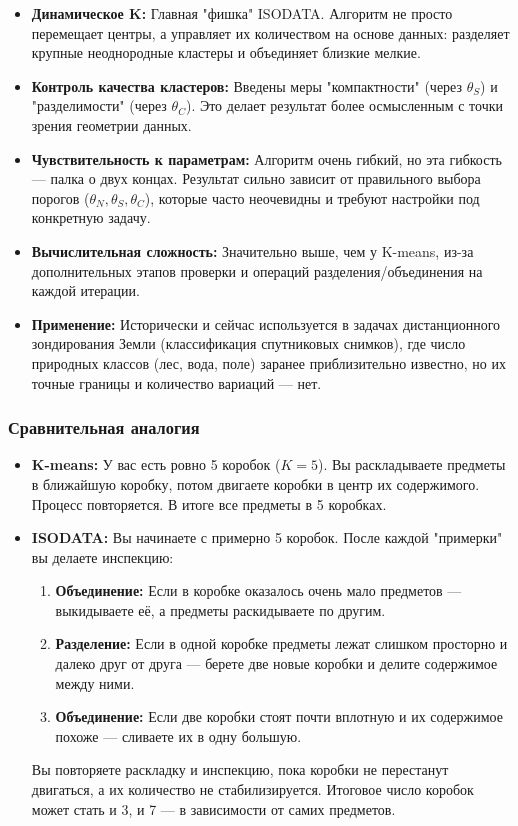 \documentclass[11pt]{article}
\begin{document}
\begin{itemize}
    \item \textbf{Динамическое K:} Главная "фишка" ISODATA. Алгоритм не просто перемещает центры, а управляет их количеством на основе данных: разделяет крупные неоднородные кластеры и объединяет близкие мелкие.
    
    \item \textbf{Контроль качества кластеров:} Введены меры "компактности" (через $\theta_S$) и "разделимости" (через $\theta_C$). Это делает результат более осмысленным с точки зрения геометрии данных.
    
    \item \textbf{Чувствительность к параметрам:} Алгоритм очень гибкий, но эта гибкость — палка о двух концах. Результат сильно зависит от правильного выбора порогов ($\theta_N, \theta_S, \theta_C$), которые часто неочевидны и требуют настройки под конкретную задачу.
    
    \item \textbf{Вычислительная сложность:} Значительно выше, чем у K-means, из-за дополнительных этапов проверки и операций разделения/объединения на каждой итерации.
    
    \item \textbf{Применение:} Исторически и сейчас используется в задачах дистанционного зондирования Земли (классификация спутниковых снимков), где число природных классов (лес, вода, поле) заранее приблизительно известно, но их точные границы и количество вариаций — нет.
\end{itemize}

\subsubsection{Сравнительная аналогия}

\begin{itemize}
    \item \textbf{K-means:} У вас есть ровно 5 коробок ($K=5$). Вы раскладываете предметы в ближайшую коробку, потом двигаете коробки в центр их содержимого. Процесс повторяется. В итоге все предметы в 5 коробках.
    
    \item \textbf{ISODATA:} Вы начинаете с примерно 5 коробок. После каждой "примерки" вы делаете инспекцию:
    \begin{enumerate}
        \item \textbf{Объединение:} Если в коробке оказалось очень мало предметов — выкидываете её, а предметы раскидываете по другим.
        \item \textbf{Разделение:} Если в одной коробке предметы лежат слишком просторно и далеко друг от друга — берете две новые коробки и делите содержимое между ними.
        \item \textbf{Объединение:} Если две коробки стоят почти вплотную и их содержимое похоже — сливаете их в одну большую.
    \end{enumerate}
    Вы повторяете раскладку и инспекцию, пока коробки не перестанут двигаться, а их количество не стабилизируется. Итоговое число коробок может стать и 3, и 7 — в зависимости от самих предметов.
\end{itemize}
\end{document}
